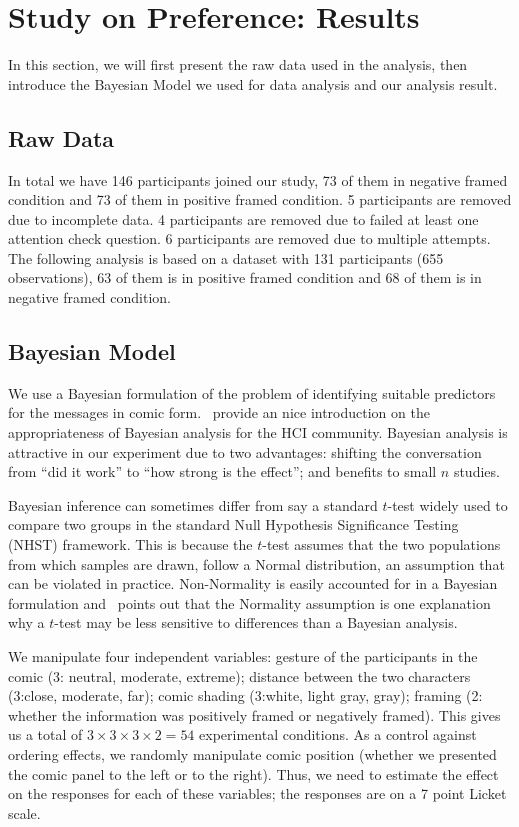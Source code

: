 
\section{Study on Preference: Results}
\label{sec:Results}
In this section, we will first present the raw data used in the analysis, then introduce the Bayesian Model we used for data analysis and our analysis result.

\subsection{Raw Data}
\label{sub:Raw Data}
In total we have 146 participants joined our study, 73 of them in negative framed condition and 73 of them in positive framed condition. 5 participants are removed due to incomplete data. 4 participants are removed due to failed at least one attention check question. 6 participants are removed due to multiple attempts. The following analysis is based on a dataset with 131 participants (655 observations), 63 of them is in positive framed condition and 68 of them is in negative framed condition.

\subsection{Bayesian Model}
\label{sub:Bayesian Model}
We use a Bayesian formulation of the problem of identifying suitable predictors for the messages in comic form.~\textcite{Kay2016} provide an nice introduction on the appropriateness of Bayesian analysis for the HCI community. Bayesian analysis is attractive in our experiment due to two advantages: shifting the conversation from ``did it work'' to ``how strong is the effect''; and benefits to small $n$ studies.

Bayesian inference can sometimes differ from say a standard $t$-test widely used to compare two groups in the standard Null Hypothesis Significance Testing (NHST) framework. This is because the $t$-test assumes that the two populations from which samples are drawn, follow a Normal distribution, an assumption that can be violated in practice. Non-Normality is easily accounted for in a Bayesian formulation and~\textcite[][p. 470]{Kruschke2010} points out that the Normality assumption is one explanation why a $t$-test may be less sensitive to differences than a Bayesian analysis.

We manipulate four independent variables: gesture of the participants in the comic (3: neutral, moderate, extreme);  distance between the two characters (3:close, moderate, far); comic shading (3:white, light gray, gray); framing (2: whether the information was positively framed or negatively framed).  This gives us a total of $3 \times 3 \times 3 \times 2= 54$ experimental conditions. As a control against ordering effects, we randomly manipulate comic position (whether we presented the comic panel to the left or to the right).  Thus, we need to estimate the effect on the responses for each of these variables; the responses are on a 7 point Licket scale.

